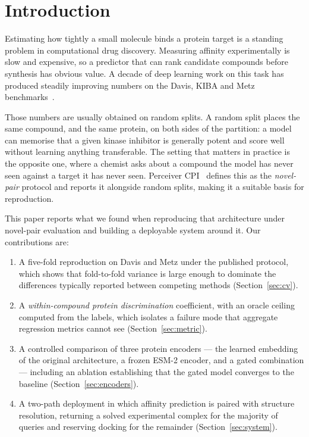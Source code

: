 \documentclass[conference]{IEEEtran}
\begin{document}
\section{Introduction}

Estimating how tightly a small molecule binds a protein target is a standing problem in
computational drug discovery. Measuring affinity experimentally is slow and expensive, so a
predictor that can rank candidate compounds before synthesis has obvious value. A decade of deep
learning work on this task has produced steadily improving numbers on the Davis, KIBA and Metz
benchmarks~\cite{davis2011,tang2014,metz2011,ozturk2018}.

Those numbers are usually obtained on random splits. A random split places the same compound, and
the same protein, on both sides of the partition: a model can memorise that a given kinase
inhibitor is generally potent and score well without learning anything transferable. The setting
that matters in practice is the opposite one, where a chemist asks about a compound the model has
never seen against a target it has never seen. Perceiver CPI~\cite{nguyen2023} defines this as the
\emph{novel-pair} protocol and reports it alongside random splits, making it a suitable basis for
reproduction.

This paper reports what we found when reproducing that architecture under novel-pair evaluation and
building a deployable system around it. Our contributions are:

\begin{enumerate}
\item A five-fold reproduction on Davis and Metz under the published protocol, which shows that
      fold-to-fold variance is large enough to dominate the differences typically reported between
      competing methods (Section~\ref{sec:cv}).
\item A \emph{within-compound protein discrimination} coefficient, with an oracle ceiling computed
      from the labels, which isolates a failure mode that aggregate regression metrics cannot see
      (Section~\ref{sec:metric}).
\item A controlled comparison of three protein encoders --- the learned embedding of the original
      architecture, a frozen ESM-2 encoder, and a gated combination --- including an ablation
      establishing that the gated model converges to the baseline (Section~\ref{sec:encoders}).
\item A two-path deployment in which affinity prediction is paired with structure resolution,
      returning a solved experimental complex for the majority of queries and reserving docking for
      the remainder (Section~\ref{sec:system}).
\end{enumerate}
\end{document}
